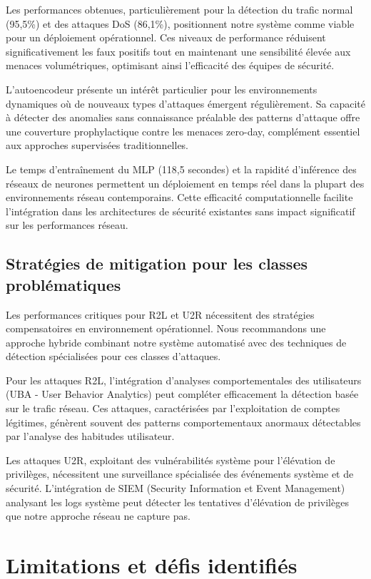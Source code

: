 Les performances obtenues, particulièrement pour la détection du trafic normal (95,5\%) et des attaques DoS (86,1\%), positionnent notre système comme viable pour un déploiement opérationnel. Ces niveaux de performance réduisent significativement les faux positifs tout en maintenant une sensibilité élevée aux menaces volumétriques, optimisant ainsi l'efficacité des équipes de sécurité.

L'autoencodeur présente un intérêt particulier pour les environnements dynamiques où de nouveaux types d'attaques émergent régulièrement. Sa capacité à détecter des anomalies sans connaissance préalable des patterns d'attaque offre une couverture prophylactique contre les menaces zero-day, complément essentiel aux approches supervisées traditionnelles.

Le temps d'entraînement du MLP (118,5 secondes) et la rapidité d'inférence des réseaux de neurones permettent un déploiement en temps réel dans la plupart des environnements réseau contemporains. Cette efficacité computationnelle facilite l'intégration dans les architectures de sécurité existantes sans impact significatif sur les performances réseau.

\subsection{Stratégies de mitigation pour les classes problématiques}

Les performances critiques pour R2L et U2R nécessitent des stratégies compensatoires en environnement opérationnel. Nous recommandons une approche hybride combinant notre système automatisé avec des techniques de détection spécialisées pour ces classes d'attaques.

Pour les attaques R2L, l'intégration d'analyses comportementales des utilisateurs (UBA - User Behavior Analytics) peut compléter efficacement la détection basée sur le trafic réseau. Ces attaques, caractérisées par l'exploitation de comptes légitimes, génèrent souvent des patterns comportementaux anormaux détectables par l'analyse des habitudes utilisateur.

Les attaques U2R, exploitant des vulnérabilités système pour l'élévation de privilèges, nécessitent une surveillance spécialisée des événements système et de sécurité. L'intégration de SIEM (Security Information et Event Management) analysant les logs système peut détecter les tentatives d'élévation de privilèges que notre approche réseau ne capture pas.

\section{Limitations et défis identifiés}

